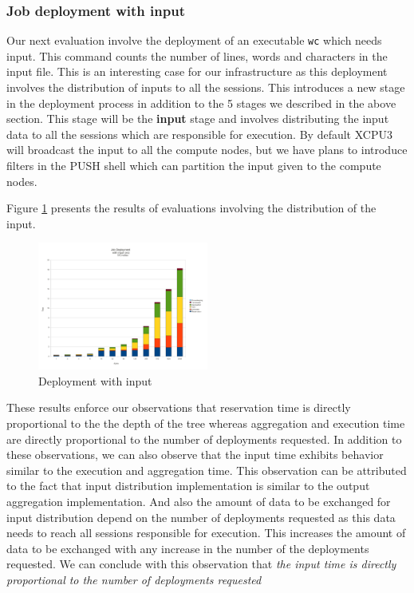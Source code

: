 \documentclass{sig-alternate}
\begin{document}
\subsubsection{Job deployment with input}
Our next evaluation involve the deployment of an executable \texttt{wc} which
needs input. This command counts the number of lines, words and characters in
the input file.  This is an interesting case for our infrastructure as this
deployment involves the distribution of inputs to all the sessions.  This
introduces a new stage in the deployment process in addition to the 5 stages we
described in the above section.  This stage will be the \textbf{input} stage and
involves distributing the input data to all the sessions which are responsible
for execution.  By default XCPU3 will broadcast the input to all the compute
nodes, but we have plans to introduce filters in the PUSH shell which can
partition the input given to the compute  nodes. 

Figure \ref{fig:wc_graph} presents the results of evaluations involving the
distribution of the input.


\begin{figure}[h]
  \begin{center}
    \leavevmode
      \includegraphics[height=0.2\textheight,width=0.5\textwidth]
		{./img/wc_graph}
    \caption{Deployment with input}
    \label{fig:wc_graph}
  \end{center}
\end{figure}

These results enforce our observations that reservation time is directly
proportional to the the depth of the tree whereas aggregation and execution time
are directly proportional to the number of deployments requested.  In addition
to these observations, we can also observe that the input time exhibits 
behavior similar to the execution and aggregation time.  This observation can be
attributed to the fact that input distribution implementation is similar
to the output aggregation implementation.  And also the amount of data to be
exchanged for input distribution depend on the number of deployments requested
as this data needs to reach all sessions responsible for execution.  This
increases the amount of data to be exchanged with any increase in the number of
the deployments requested.  We can conclude with this observation that
\textit{the input time is directly proportional to the number of deployments
requested}
\end{document}
